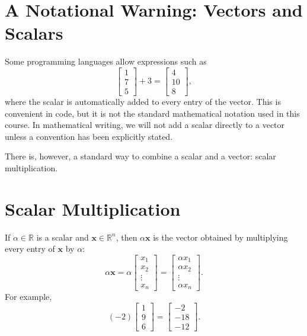 \section{A Notational Warning: Vectors and Scalars}
\label{mf:vector-scalar-warning}

Some programming languages allow expressions such as
\[
\begin{bmatrix}1\\7\\5\end{bmatrix}+3
=
\begin{bmatrix}4\\10\\8\end{bmatrix},
\]
where the scalar is automatically added to every entry of the vector. This is convenient in code, but it is not the standard mathematical notation used in this course. In mathematical writing, we will not add a scalar directly to a vector unless a convention has been explicitly stated.

There is, however, a standard way to combine a scalar and a vector: scalar multiplication.

\section{Scalar Multiplication}
\label{mf:scalar-multiplication}

If \(\alpha\in\mathbb{R}\) is a scalar and \(\mathbf{x}\in\mathbb{R}^n\), then \(\alpha\mathbf{x}\) is the vector obtained by multiplying every entry of \(\mathbf{x}\) by \(\alpha\):
\[
\alpha\mathbf{x}
=
\alpha
\begin{bmatrix}x_1\\x_2\\\vdots\\x_n\end{bmatrix}
=
\begin{bmatrix}
\alpha x_1\\
\alpha x_2\\
\vdots\\
\alpha x_n
\end{bmatrix}.
\]
For example,
\[
(-2)
\begin{bmatrix}1\\9\\6\end{bmatrix}
=
\begin{bmatrix}-2\\-18\\-12\end{bmatrix}.
\]

